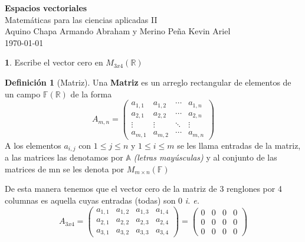 \documentclass[letterpaper]{article}
\newcommand{\F}{\mathds{F}}
\newcommand{\R}{\mathds{R}}
\renewcommand{\*}{\cdot}
\theoremstyle{definition}
\newtheorem{definition}{Definición}
\begin{document}
		\begin{titlepage}
		\begin{center}
			\Large{\textbf{Espacios vectoriales}} \\[0.1cm]
			\huge{Matemáticas para las ciencias aplicadas II}\\[0.2cm]
			\large{Aquino Chapa Armando Abraham y Merino Peña Kevin Ariel }
			\\
			\today
		\end{center}
		\let\newpage\relax%
		\hrulefill
	\end{titlepage}

	
	\noindent \textbf{1}. Escribe el vector cero en $M_{3x4}(\mathbb{R})$
		\begin{definition}[Matriz]
		Una \textbf{Matriz} es un arreglo rectangular de elementos de un campo $ \F(\R) $ de la forma
		\begin{equation*}
		A_{m,n} = 
		\begin{pmatrix}
		a_{1,1} & a_{1,2} & \cdots & a_{1,n} \\
		a_{2,1} & a_{2,2} & \cdots & a_{2,n} \\
		\vdots  & \vdots  & \ddots & \vdots  \\
		a_{m,1} & a_{m,2} & \cdots & a_{m,n} 
		\end{pmatrix}
		\end{equation*}
		A los elementos $ a_{i,j} $ con $ 1 \leq j \leq n $ y $ 1 \leq i \leq m $ se les llama entradas de la matriz, a las matrices las denotamos por $ \mathds{A} $ 				\textit{(letras mayúsculas)} y al conjunto de las matrices de mn se les denota por $ M_{m\times n}(\F) $
		
	\end{definition}
	De esta manera tenemos que el vector cero de la matriz de 3 renglones por 4 columnas es aquella cuyas entradas (todas) son 0 \textit{i. e. }
		\begin{equation*}
		A_{3x4} = 
		\begin{pmatrix}
		a_{1,1} & a_{1,2} & a_{1,3} & a_{1,4} \\
		a_{2,1} & a_{2,2} & a_{2,3} & a_{2,4} \\
		a_{3,1} & a_{3,2} & a_{3,3} & a_{3,4} 
		\end{pmatrix}
		= 
		\begin{pmatrix}
		0 & 0 & 0 & 0\\
		0 & 0 & 0 & 0 \\
		0 & 0 & 0 & 0
		\end{pmatrix}
		\end{equation*}
		
\end{document}
